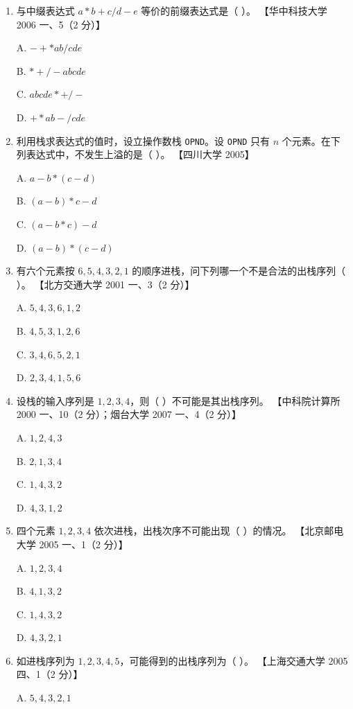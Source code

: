 \documentclass[lang=cn,newtx,10pt,scheme=chinese]{../../elegantbook}
\begin{document}
\begin{enumerate}
    \item 与中缀表达式 $a * b + c / d - e$ 等价的前缀表达式是（ ）。  
    【华中科技大学 2006 一、5（2 分）】  

    A. $- + * a b / c d e$  

    B. $* + /-a b  c d  e$  

    C. $a b c d  e *+/-$  

    D. $+ * a b - / c d e$  

    \item 利用栈求表达式的值时，设立操作数栈 \texttt{OPND}。设 \texttt{OPND} 只有 $n$ 个元素。在下列表达式中，不发生上溢的是（ ）。  
    【四川大学 2005】  

    A. $a - b * (c - d)$  

    B. $(a - b) * c - d$  

    C. $(a - b * c) - d$  

    D. $(a - b) * (c - d)$  

    \item 有六个元素按 $6, 5, 4, 3, 2, 1$ 的顺序进栈，问下列哪一个不是合法的出栈序列（ ）。  
    【北方交通大学 2001 一、3（2 分）】  

    A. $5, 4, 3, 6, 1, 2$  

    B. $4, 5, 3, 1, 2, 6$  

    C. $3, 4, 6, 5, 2, 1$ 

    D. $2, 3, 4, 1, 5, 6$  

    \item 设栈的输入序列是 $1, 2, 3, 4$，则（ ）不可能是其出栈序列。  
    【中科院计算所 2000 一、10（2 分）；烟台大学 2007 一、4（2 分）】  

    A. $1, 2, 4, 3$  

    B. $2, 1, 3, 4$  

    C. $1, 4, 3, 2$  

    D. $4, 3, 1, 2$  

    \item 四个元素 $1, 2, 3, 4$ 依次进栈，出栈次序不可能出现（ ）的情况。  
    【北京邮电大学 2005 一、1（2 分）】  

    A. $1, 2, 3, 4$  

    B. $4, 1, 3, 2$  

    C. $1, 4, 3, 2$  

    D. $4, 3, 2, 1$ 

    \item 如进栈序列为 $1, 2, 3, 4, 5$，可能得到的出栈序列为（ ）。  
    【上海交通大学 2005 四、1（2 分）】  

    A. $5, 4, 3, 2, 1$  


\end{enumerate}
\end{document}
